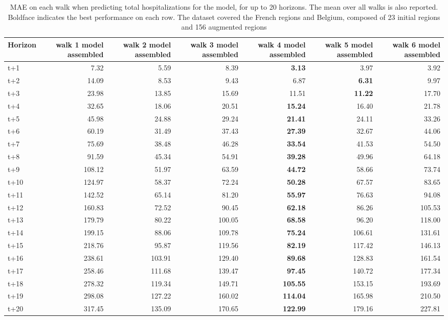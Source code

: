 \begin{table}[H]
\centering
\caption{MAE on each walk when predicting total hospitalizations for the model, for up to 20 horizons. The mean over all walks is also reported. Boldface indicates the best performance on each row. The dataset covered the French regions and Belgium, composed of 23 initial regions and 156 augmented regions }
\label{tab:MAE_walk_assembly}
\begin{tabular}{lrrrrrr}
\toprule
Horizon &  walk 1 model assembled &  walk 2 model assembled &  walk 3 model assembled &  walk 4 model assembled &  walk 5 model assembled &  walk 6 model assembled \\
\midrule
t+1  & 7.32  & 5.59  & 8.39  & \textbf{3.13}  & 3.97  & 3.92  \\
t+2  & 14.09  & 8.53  & 9.43  & 6.87  & \textbf{6.31}  & 9.97  \\
t+3  & 23.98  & 13.85  & 15.69  & 11.51  & \textbf{11.22}  & 17.70  \\
t+4  & 32.65  & 18.06  & 20.51  & \textbf{15.24}  & 16.40  & 21.78  \\
t+5  & 45.98  & 24.88  & 29.24  & \textbf{21.41}  & 24.11  & 33.26  \\
t+6  & 60.19  & 31.49  & 37.43  & \textbf{27.39}  & 32.67  & 44.06  \\
t+7  & 75.69  & 38.48  & 46.28  & \textbf{33.54}  & 41.53  & 54.50  \\
t+8  & 91.59  & 45.34  & 54.91  & \textbf{39.28}  & 49.96  & 64.18  \\
t+9  & 108.12  & 51.97  & 63.59  & \textbf{44.72}  & 58.66  & 73.74  \\
t+10  & 124.97  & 58.37  & 72.24  & \textbf{50.28}  & 67.57  & 83.65  \\
t+11  & 142.52  & 65.14  & 81.20  & \textbf{55.97}  & 76.63  & 94.08  \\
t+12  & 160.83  & 72.52  & 90.45  & \textbf{62.18}  & 86.26  & 105.53  \\
t+13  & 179.79  & 80.22  & 100.05  & \textbf{68.58}  & 96.20  & 118.00  \\
t+14  & 199.15  & 88.06  & 109.78  & \textbf{75.24}  & 106.61  & 131.61  \\
t+15  & 218.76  & 95.87  & 119.56  & \textbf{82.19}  & 117.42  & 146.13  \\
t+16  & 238.61  & 103.91  & 129.40  & \textbf{89.68}  & 128.83  & 161.54  \\
t+17  & 258.46  & 111.68  & 139.47  & \textbf{97.45}  & 140.72  & 177.34  \\
t+18  & 278.32  & 119.34  & 149.71  & \textbf{105.55}  & 153.15  & 193.69  \\
t+19  & 298.08  & 127.22  & 160.02  & \textbf{114.04}  & 165.98  & 210.50  \\
t+20  & 317.45  & 135.09  & 170.65  & \textbf{122.99}  & 179.16  & 227.81  \\

\bottomrule
\end{tabular}
\end{table}
